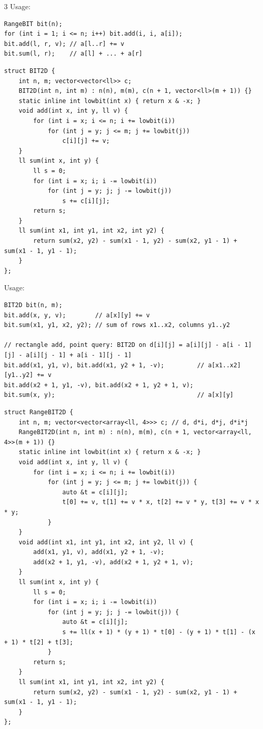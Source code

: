 \documentclass[8pt]{extarticle}
\begin{document}
\begin{multicols*}{3}
Usage:

\begin{lstlisting}
RangeBIT bit(n);
for (int i = 1; i <= n; i++) bit.add(i, i, a[i]);
bit.add(l, r, v); // a[l..r] += v
bit.sum(l, r);    // a[l] + ... + a[r]
\end{lstlisting}

\begin{lstlisting}
struct BIT2D {
    int n, m; vector<vector<ll>> c;
    BIT2D(int n, int m) : n(n), m(m), c(n + 1, vector<ll>(m + 1)) {}
    static inline int lowbit(int x) { return x & -x; }
    void add(int x, int y, ll v) {
        for (int i = x; i <= n; i += lowbit(i))
            for (int j = y; j <= m; j += lowbit(j))
                c[i][j] += v;
    }
    ll sum(int x, int y) {
        ll s = 0;
        for (int i = x; i; i -= lowbit(i))
            for (int j = y; j; j -= lowbit(j))
                s += c[i][j];
        return s;
    }
    ll sum(int x1, int y1, int x2, int y2) {
        return sum(x2, y2) - sum(x1 - 1, y2) - sum(x2, y1 - 1) + sum(x1 - 1, y1 - 1);
    }
};
\end{lstlisting}

Usage:

\begin{lstlisting}
BIT2D bit(n, m);
bit.add(x, y, v);        // a[x][y] += v
bit.sum(x1, y1, x2, y2); // sum of rows x1..x2, columns y1..y2

// rectangle add, point query: BIT2D on d[i][j] = a[i][j] - a[i - 1][j] - a[i][j - 1] + a[i - 1][j - 1]
bit.add(x1, y1, v), bit.add(x1, y2 + 1, -v);         // a[x1..x2][y1..y2] += v
bit.add(x2 + 1, y1, -v), bit.add(x2 + 1, y2 + 1, v);
bit.sum(x, y);                                       // a[x][y]
\end{lstlisting}

\begin{lstlisting}
struct RangeBIT2D {
    int n, m; vector<vector<array<ll, 4>>> c; // d, d*i, d*j, d*i*j
    RangeBIT2D(int n, int m) : n(n), m(m), c(n + 1, vector<array<ll, 4>>(m + 1)) {}
    static inline int lowbit(int x) { return x & -x; }
    void add(int x, int y, ll v) {
        for (int i = x; i <= n; i += lowbit(i))
            for (int j = y; j <= m; j += lowbit(j)) {
                auto &t = c[i][j];
                t[0] += v, t[1] += v * x, t[2] += v * y, t[3] += v * x * y;
            }
    }
    void add(int x1, int y1, int x2, int y2, ll v) {
        add(x1, y1, v), add(x1, y2 + 1, -v);
        add(x2 + 1, y1, -v), add(x2 + 1, y2 + 1, v);
    }
    ll sum(int x, int y) {
        ll s = 0;
        for (int i = x; i; i -= lowbit(i))
            for (int j = y; j; j -= lowbit(j)) {
                auto &t = c[i][j];
                s += ll(x + 1) * (y + 1) * t[0] - (y + 1) * t[1] - (x + 1) * t[2] + t[3];
            }
        return s;
    }
    ll sum(int x1, int y1, int x2, int y2) {
        return sum(x2, y2) - sum(x1 - 1, y2) - sum(x2, y1 - 1) + sum(x1 - 1, y1 - 1);
    }
};
\end{lstlisting}


\end{multicols*}
\end{document}
